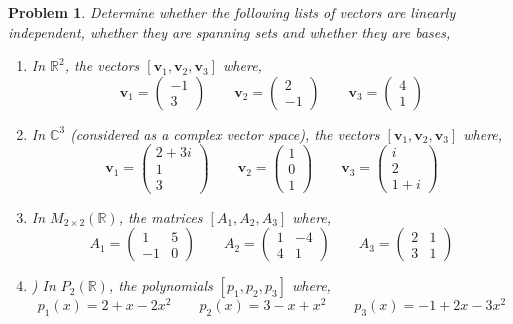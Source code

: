 \documentclass{article}
\newcommand{\R}{\mathbb{R}}
\newcommand{\C}{\mathbb{C}}
\renewcommand{\vec}[1]{\boldsymbol{\mathbf{#1}}}
\newcommand{\tbt}[4]{\begin{pmatrix} #1 & #2 \\ #3 & #4\end{pmatrix}}
\newcommand{\vect}[2]{\begin{pmatrix} #1 \\ #2 \end{pmatrix}}
\newcommand{\vecth}[3]{\begin{pmatrix} #1 \\ #2 \\ #3 \end{pmatrix}}
\newtheorem{problem}{Problem}
\begin{document}
\newpage
\begin{problem}
  Determine whether the following lists of vectors are linearly independent, whether they are spanning sets and whether they are bases,
  \begin{enumerate}
    \item In $\R^2$, the vectors $[\vec v_1, \vec v_2, \vec v_3]$ where,
    $$ \vec v_1 = \vect {-1} 3 \qquad \vec v_2 = \vect 2 {-1} \qquad \vec v_3 = \vect 4 1 $$
    \item  In $\C^3$ (considered as a complex vector space), the vectors $[\vec v_1, \vec v_2, \vec v_3]$ where,
    $$ \vec v_1 = \vecth {2 +3i} 1 3 \qquad \vec v_2 = \vecth 1 0 1 \qquad \vec v_3 = \vecth i 2 {1+i} $$
    \item In $M_{2\times 2}(\R)$, the matrices $[A_1, A_2, A_3]$ where,
    $$ A_1 = \tbt 1 5 {-1} 0 \qquad A_2 = \tbt 1 {-4} 4 1 \qquad A_3 = \tbt 2 1 3 1 $$
    \item ) In $ P_2(\R)$, the polynomials $[p_1, p_2, p_3]$ where,
    $$ p_1(x) = 2 + x - 2x^2 \qquad p_2(x) = 3 - x + x^2 \qquad p_3(x) = -1 + 2x - 3x^2$$
  \end{enumerate}
\end{problem}
\end{document}

